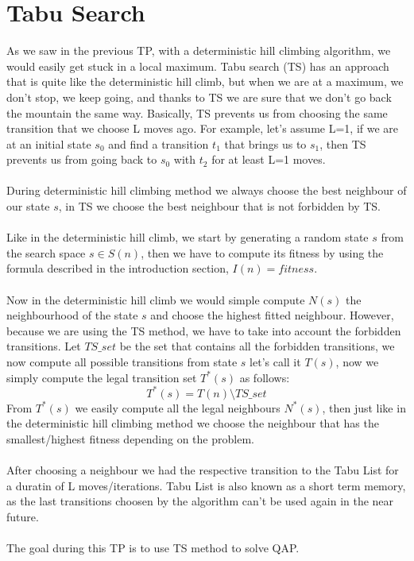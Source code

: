 \documentclass[a4paper]{article}
\begin{document}
\section{Tabu Search}
As we saw in the previous TP, with a deterministic hill climbing algorithm, we would easily get stuck in a local maximum. Tabu search (TS) has an approach that is quite like the deterministic hill climb, but when we are at a maximum, we don't stop, we keep going, and thanks to TS we are sure that we don't go back the mountain the same way. Basically, TS prevents us from choosing the same transition that we choose L moves ago. For example, let's assume L=1, if we are at an initial state $s_{0}$ and find a transition $t_1$ that brings us to $s_{1}$, then TS prevents us from going back to $s_0$ with $t_2$ for at least L=1 moves.\\\\
During deterministic hill climbing method we always choose the best neighbour of our state $s$, in TS we choose the best neighbour that is not forbidden by TS.\\\\
Like in the deterministic hill climb, we start by generating a random state $s$ from the search space $s \in S(n)$, then we have to compute its fitness by using the formula described in the introduction section, $I(n) = fitness$.\\\\
Now in the deterministic hill climb we would simple compute $N(s)$ the neighbourhood of the state $s$ and choose the highest fitted neighbour. However, because we are using the TS method, we have to take into account the forbidden transitions. Let $TS\_set$ be the set that contains all the forbidden transitions, we now compute all possible transitions from state $s$ let's call it $T(s)$, now we simply compute the legal transition set $T^*(s)$ as follows:\\
$$T^*(s) = T(n) \setminus TS\_set$$
From $T^*(s)$ we easily compute all the legal neighbours $N^*(s)$, then just like in the deterministic hill climbing method we choose the neighbour that has the smallest/highest fitness depending on the problem.\\\\
After choosing a neighbour we had the respective transition to the Tabu List for a duratin of L moves/iterations. Tabu List is also known as a short term memory, as the last transitions choosen by the algorithm can't be used again in the near future.\\\\
The goal during this TP is to use TS method to solve QAP.
\end{document}
